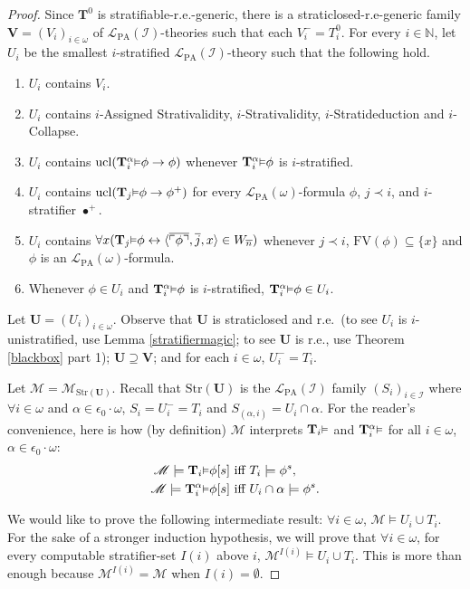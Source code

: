 \documentclass[reqno]{article}
\theoremstyle{definition}
\def\N{\mathbb{N}}
\def\L{\mathscr{L}}
\def\M{\mathscr{M}}
\def\T{\mathbf{T}}
\def\U{\mathbf{U}}
\def\V{\mathbf{V}}
\def\FV{\mathrm{FV}}
\def\LPA{\L_{\mathrm{PA}}}
\def\epom{\epsilon_0\cdot\omega}
\def\indset{\mathcal I}
\renewcommand{\Pr}[1]{\T_{#1}\mbox{\small${\vDash}$}}
\newcommand{\Prr}[2]{\T^{#1}_{#2}\mbox{\small${\vDash}$}}
\newcommand{\ucl}[1]{\mathrm{ucl}(#1)}
\newcommand{\str}[1]{\mathrm{Str}(#1)} \newcommand{\Str}[1]{\str{#1}}
\begin{document}
\begin{proof}
Since $\T^0$ is stratifiable-r.e.-generic, there is 
a straticlosed-r.e-generic
family $\V=(V_i)_{i\in\omega}$ of $\LPA(\indset)$-theories such that each $V^-_i=T^0_i$.
For every $i\in\N$, let $U_i$ be the smallest
$i$-stratified $\LPA(\indset)$-theory such that the following hold.
\begin{enumerate}
\item $U_i$ contains $V_i$.
\item $U_i$ contains $i$-Assigned Strativalidity, $i$-Strativalidity, $i$-Stratideduction and $i$-Collapse.
\item $U_i$ contains $\ucl{\Prr\alpha i\phi\rightarrow\phi}$ whenever $\Prr\alpha i\phi$ is $i$-stratified.
\item $U_i$ contains $\ucl{\Pr j\phi\rightarrow\phi^+}$ for every $\LPA(\omega)$-formula $\phi$, $j\prec i$,
and $i$-stratifier $\bullet^+$.
\item $U_i$ contains $\forall x(\Pr j\phi\leftrightarrow\langle\overline{\ulcorner\phi\urcorner},\overline j,x\rangle\in W_{\overline n})$
whenever $j\prec i$, $\FV(\phi)\subseteq\{x\}$ and $\phi$ is an $\LPA(\omega)$-formula.
\item Whenever $\phi\in U_i$ and $\Prr\alpha i\phi$ is $i$-stratified, $\Prr\alpha i\phi\in U_i$.
\end{enumerate}
Let $\U=(U_i)_{i\in\omega}$.  Observe that $\U$ is straticlosed and r.e.~(to see $U_i$ is
$i$-unistratified, use
Lemma \ref{stratifiermagic}; to see $\U$ is r.e., use
Theorem \ref{blackbox} part 1); $\U\supseteq\V$; and for each $i\in\omega$,
$U_i^-=T_i$.

Let $\M=\M_{\str{\U}}$.
Recall that
$\str{\U}$ is the $\LPA(\indset)$ family $(S_i)_{i\in\indset}$
where $\forall i\in\omega$ and $\alpha\in\epom$, $S_i=U^-_i=T_i$ and
$S_{(\alpha,i)}=U_i\cap \alpha$.
For the reader's convenience, here is how (by definition)
$\M$ interprets $\Pr i$ and $\Prr \alpha i$ for all $i\in\omega$, $\alpha\in\epom$:
\begin{align*}
    \M\models \Pr i \phi[s] &\mbox{ iff } T_i\models \phi^s,\\
    \M\models \Prr \alpha i \phi[s] &\mbox{ iff } U_i\cap \alpha\models\phi^s.
\end{align*}

We would like to prove the following intermediate result:
$\forall i\in\omega$, $\M\models U_i\cup T_i$.
For the sake of a stronger induction hypothesis, we will prove that
$\forall i\in\omega$, for every computable stratifier-set $I(i)$ above $i$,
$\M^{I(i)}\models U_i\cup T_i$.
This is more than enough because $\M^{I(i)}=\M$ when
$I(i)=\emptyset$.


\end{proof}
\end{document}
